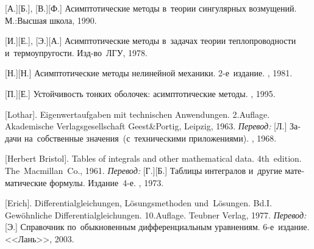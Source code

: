 \begin{thebibliography}{123}
\begin{otherlanguage}{russian}
[А.][Б.], [В.][Ф.] Асимптотические методы в~теории сингулярных возмущений. М.:\;Высшая школа, 1990. 

[И.][Е.], %
[Э.][А.] %
Асимптотические методы в~задачах теории теплопроводности и~термоупругости. Изд\hbox{-}во~ЛГУ, 1978. 

[Н.][Н.] Асимптотические методы нелинейной механики. 2\hbox{-}е~издание. \naukapublisher, 1981. 

[П.][Е.] Устойчивость тонких оболочек: асимптотические методы. \naukapublisher, 1995. 

%
%



[Lothar]. Eigenwertaufgaben mit technischen Anwendungen. 2.\:Auflage. Akademische Verlagsgesellschaft Geest\;\&\;Portig, Leipzig, 1963. 
\emph{Перевод:} [Л.] Задачи на~собственные значения~(с~техническими приложениями). \naukapublisher, 1968. 

[Herbert Bristol]. Tables of integrals and other mathematical data. 4th~edition. The~Macmillan~Co., 1961. 
\emph{Перевод:} [Г.][Б.] Таблицы интегралов и~другие математические формулы. Издание~4\hbox{-}е. \naukapublisher, 1973. 

[Erich]. Differentialgleichungen, Lösungsmethoden und~Lö\-sun\-gen. Bd.\:I. Gewöhnliche Differentialgleichungen. 10.\:Auflage. Teubner Verlag, 1977. 
\emph{Перевод:} [Э.] Справочник по~обыкновенным дифференциальным уравнениям. 6\hbox{-}е~издание. <<Лань>>, 2003. 


\end{otherlanguage}
\end{thebibliography}
